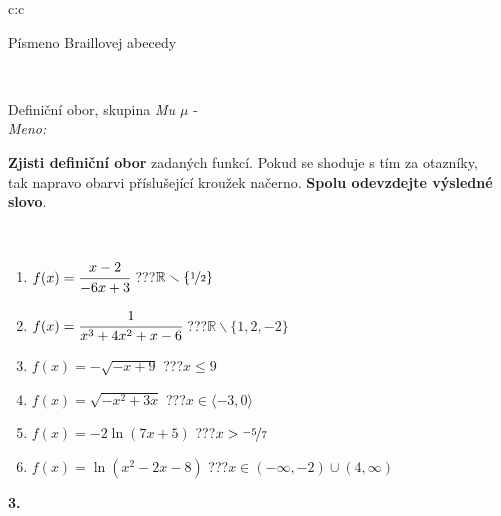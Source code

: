 \documentclass[10pt]{report}
\begin{document}
\begin{tabular}{c:c}
\begin{minipage}[c][104.5mm][t]{0.5\linewidth}
\begin{center}
\begin{minipage}{0.20\linewidth}
\begin{center}
{\small Písmeno Braillovej abecedy}
\end{center}
\end{minipage}
\end{center}
\end{minipage}
\\ \hdashline
\begin{minipage}[c][104.5mm][t]{0.5\linewidth}
\begin{center}
\vspace{7mm}
{\huge Definiční obor, skupina \textit{Mu $\mu$} -}\\[5mm]
\textit{Meno:}\phantom{xxxxxxxxxxxxxxxxxxxxxxxxxxxxxxxxxxxxxxxxxxxxxxxxxxxxxxxxxxxxxxxxx}\\[5mm]
\begin{minipage}{0.95\linewidth}
\textbf{Zjisti definiční obor} zadaných funkcí. Pokud se shoduje s tím za otazníky,\\tak napravo obarvi příslušející kroužek načerno. \textbf{Spolu odevzdejte výsledné slovo}.
\end{minipage}
\\[1mm]
\begin{minipage}{0.79\linewidth}
\begin{center}
\begin{varwidth}{\linewidth}
\begin{enumerate}
\normalsizerrr
\item $f(x)=\cfrac{x-2}{-6x+3}$\quad \dotfill\; ???\;\dotfill \quad $\mathbb{R}\smallsetminus\{\nicefrac{1}{2}\}$
\item $f(x)=\cfrac{1}{x^3+4x^2+x-6}$\quad \dotfill\; ???\;\dotfill \quad $\mathbb{R}\smallsetminus\{1,2,-2\}$
\item $f(x)=-\sqrt{-x+9}$\quad \dotfill\; ???\;\dotfill \quad $x\leq9$
\item $f(x)=\sqrt{-x^2+3x}$\quad \dotfill\; ???\;\dotfill \quad $x\in\langle-3 , 0\rangle$
\item $f(x)=-2\ln{(7x+5)}$\quad \dotfill\; ???\;\dotfill \quad $x>\nicefrac{-5}{7}$
\item $f(x)=\ln{(x^2-2x-8)}$\quad \dotfill\; ???\;\dotfill \quad $x\in(-\infty , -2)\cup(4 , \infty)$
\end{enumerate}
\end{varwidth}
\end{center}
\end{minipage}
\begin{minipage}{0.20\linewidth}
\begin{center}
{\Huge\bfseries 3.} \\[2mm]

\end{center}
\end{minipage}
\end{center}
\end{minipage}
\end{tabular}
\end{document}
